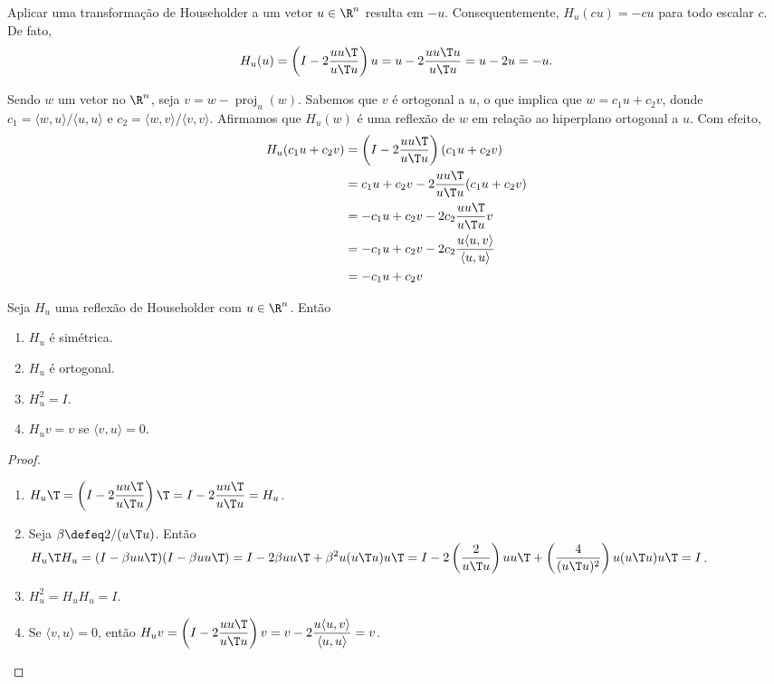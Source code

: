 \documentclass{article}
\DeclareMathOperator{\proj}{proj}
\begin{document}
Aplicar uma transformação de Householder a um vetor \(u \in \R^n\) resulta em \(-u\). Consequentemente, \(H_u(cu) = -cu\) para todo escalar \(c\). De fato,
\[
    H_u(u) = \left(I - 2\frac{uu\T }{u\T u}\right)u = u - 2\frac{uu\T u}{u\T u} = u - 2u = -u.
\]

Sendo \(w\) um vetor no \(\R^n\), seja \(v = w - \proj_u(w)\). Sabemos que \(v\) é ortogonal a \(u\), o que implica que \(w = c_1 u + c_2 v\), donde \(c_1 = \langle w, u \rangle / \langle u, u \rangle\) e \(c_2 = \langle w, v \rangle / \langle v, v \rangle\). Afirmamos que \(H_u(w)\) é uma reflexão de \(w\) em relação ao hiperplano ortogonal a \(u\). Com efeito,
\begin{align*}
    H_u(c_1 u + c_2 v) &= \left(I - 2\frac{uu\T }{u\T u}\right)(c_1 u + c_2 v) \\
    &= c_1 u + c_2 v - 2\frac{uu\T }{u\T u}(c_1 u + c_2 v) \\
    &= -c_1 u + c_2 v - 2c_2 \frac{uu\T }{u\T u}v \\
    &= -c_1 u + c_2 v - 2c_2 \frac{u \langle u, v \rangle}{\langle u, u \rangle} \\
    &= -c_1 u + c_2 v
\end{align*}

\begin{prop}
    Seja \(H_u\) uma reflexão de Householder com \(u \in \R^n\). Então
    \begin{enumerate}
        \item \(H_u\) é simétrica.
        \item \(H_u\) é ortogonal.
        \item \(H_u^2 = I\).
        \item \(H_u v = v\) se \(\langle v, u \rangle = 0\).
    \end{enumerate}
\end{prop}

\begin{proof}
    \begin{enumerate}
        \item \(\displaystyle H_u\T  = \left(I - 2\frac{uu\T }{u\T u}\right)\T  = I - 2\frac{uu\T }{u\T u} = H_u\).
        \item Seja \(\beta \defeq 2/(u\T u)\). Então \(\displaystyle H_u\T  H_u = (I - \beta uu\T )(I - \beta uu\T ) = I - 2\beta uu\T  + \beta^2 u(u\T u)u\T  = I - 2\left(\frac{2}{u\T u}\right) uu\T  + \left(\frac{4}{(u\T u)^2}\right) u(u\T u)u\T  = I\).
        \item \(H_u^2 = H_u H_u = I\).
        \item Se \(\langle v, u \rangle = 0\), então \(\displaystyle H_u v = \left(I - 2\frac{uu\T }{u\T u}\right)v = v - 2\frac{u \langle u, v \rangle}{\langle u, u \rangle} = v\).
    \end{enumerate}
\end{proof}
\end{document}
